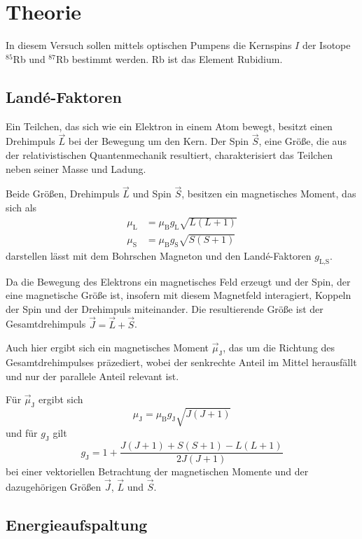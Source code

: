 \section{Theorie}
\label{sec:Theorie}
In diesem Versuch sollen mittels optischen Pumpens die Kernspins $I$ der Isotope $^{85}$Rb und $^{87}$Rb bestimmt werden. Rb ist das Element Rubidium. 

\subsection{Landé-Faktoren}

Ein Teilchen, das sich wie ein Elektron in einem Atom bewegt, besitzt einen Drehimpuls $\vec L$ bei der Bewegung um den Kern. 
Der Spin $\vec S$, eine Größe, die aus der relativistischen Quantenmechanik resultiert, charakterisiert das Teilchen neben seiner Masse und Ladung. 

Beide Größen, Drehimpuls $\vec L$ und Spin $\vec S$, besitzen ein magnetisches Moment, das sich als 
\begin{align*}
    \mu_\text{L} &= \mu_\text{B} g_\text{L} \sqrt{L(L+1)} \\ 
    \mu_\text{S} &= \mu_\text{B} g_\text{S} \sqrt{S(S+1)}
\end{align*}
darstellen lässt mit dem Bohrschen Magneton und den Landé-Faktoren $g_\text{L,S}$. 

Da die Bewegung des Elektrons ein magnetisches Feld erzeugt und der Spin, der eine magnetische Größe ist, insofern mit diesem Magnetfeld interagiert, Koppeln der Spin und der Drehimpuls miteinander. 
Die resultierende Größe ist der Gesamtdrehimpuls $\vec J = \vec L + \vec S$. 

Auch hier ergibt sich ein magnetisches Moment $\vec \mu_\text{J}$, das um die Richtung des Gesamtdrehimpulses präzediert, wobei der senkrechte Anteil im Mittel herausfällt und nur der parallele Anteil relevant ist. 

Für $\vec \mu_\text{J}$ ergibt sich 
\begin{equation*}
    \mu_\text{J} = \mu_\text{B} g_\text{J} \sqrt{J(J+1)}
\end{equation*}
und für $g_\text{J}$ gilt 
\begin{equation}
    g_\text{J} = 1 + \frac{J(J+1) + S(S+1) - L(L+1)}{2J(J+1)}
    \label{eq:gj}
\end{equation}
bei einer vektoriellen Betrachtung der magnetischen Momente und der dazugehörigen Größen $\vec J$, $\vec L$ und $\vec S$.

\subsection{Energieaufspaltung}

